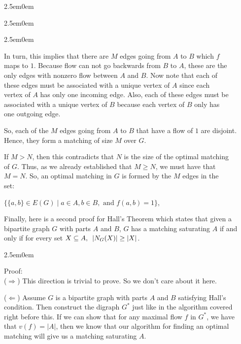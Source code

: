 \documentclass{book}
\newcommand{\hThree}{%
   \color{PineGreen}
   \fontsize{13}{15}\selectfont%
}
\newenvironment{myIndent}{%
   \begin{adjustwidth}{2.5em}{0em}%
}{%
   \end{adjustwidth}%
}
\newcommand{\uuline}[2][.]{%
{\vphantom{a}\color{#1}%
\rlap{\rule[-0.18em]{\widthof{#2}}{0.06em}}%
\rlap{\rule[-0.32em]{\widthof{#2}}{0.06em}}}%
#2}
\newcommand{\myHS}{ \hspace{0.5em}}
\newcommand{\retTwo}{\hfill\bigbreak}
\begin{document}
{\begin{myIndent}
{\begin{myIndent}
{\begin{myIndent}
         In turn, this implies that there are $M$ edges going from $A$ to $B$ which $f$\\ maps to $1$. Because flow can not go backwards from $B$ to $A$, these are the\\ only edges with nonzero flow between $A$ and $B$. Now note that each of\\ these edges must be associated with a unique vertex of $A$ since each\\ vertex of $A$ has only one incoming edge. Also, each of these edges must be\\ associated with a unique vertex of $B$ because each vertex of $B$ only has\\ one outgoing edge.\retTwo

         So, each of the $M$ edges going from $A$ to $B$ that have a flow of $1$ are disjoint.\\ Hence, they form a matching of size $M$ over $G$.\retTwo

         If $M > N$, then this contradicts that $N$ is the size of the optimal matching\\ of $G$. Thus, as we already established that $M \geq N$, we must have that\\ $M = N$. So, an optimal matching in $G$ is formed by the $M$ edges in the\\ set:
         
         {\center $\{\{a, b\} \in E(G) \mid a \in A, b \in B, \text{ and } f(a, b) = 1\}$,\retTwo\retTwo\par} 
      \end{myIndent}}
   \end{myIndent}}

   Finally, here is a second proof for \uuline{Hall's Theorem} which states that given a bipartite graph $G$ with parts $A$ and $B$, $G$ has a matching saturating $A$ if and only if for every set $X \subseteq A, \myHS |N_G(X)| \geq |X|$.

   \newpage

   \begin{myIndent} \hThree
      Proof:\\
      ($\Longrightarrow$) This direction is trivial to prove. So we don't care about it here.\retTwo

      ($\Longleftarrow$) Assume $G$ is a bipartite graph with parts $A$ and $B$ satisfying Hall's\\ condition. Then construct the digraph $G^*$ just like in the algorithm covered\\ right before this. If we can show that for any maximal flow $f$ in $G^*$, we have\\ that $v(f) = |A|$, then we know that our algorithm for finding an optimal\\ matching will  give us a matching saturating $A$.\retTwo


\end{myIndent}
\end{myIndent}}
\end{document}

